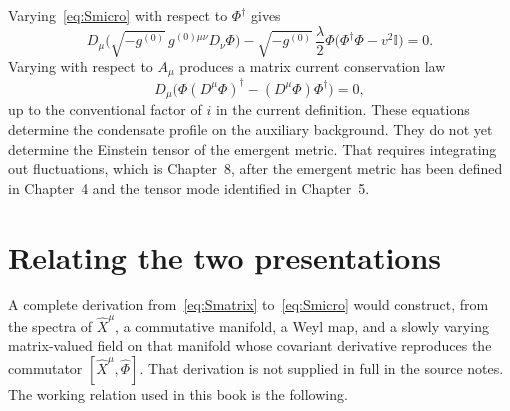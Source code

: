 Varying~\eqref{eq:Smicro} with respect to \(\Phi^\dagger\) gives
\begin{equation}
  \label{eq:Phi-eom}
  D_\mu\bigl(\sqrt{-g^{(0)}}\,g^{(0)\mu\nu}D_\nu\Phi\bigr)
  -\sqrt{-g^{(0)}}\,
   \frac{\lambda}{2}\Phi
   \bigl(\Phi^\dagger\Phi-v^2\mathbb{I}\bigr)
  =0.
\end{equation}
Varying with respect to \(A_\mu\) produces a matrix current
conservation law
\begin{equation}
  \label{eq:gauge-eom}
  D_\mu
  \bigl(
    \Phi(D^\mu\Phi)^\dagger-(D^\mu\Phi)\Phi^\dagger
  \bigr)
  =0,
\end{equation}
up to the conventional factor of \(i\) in the current definition.
These equations determine the condensate profile on the auxiliary
background. They do not yet determine the Einstein tensor of the
emergent metric. That requires integrating out fluctuations, which is
Chapter~8, after the emergent metric has been defined in Chapter~4
and the tensor mode identified in Chapter~5.

\section{Relating the two presentations}
\label{sec:ch3-relate}

A complete derivation from~\eqref{eq:Smatrix} to~\eqref{eq:Smicro}
would construct, from the spectra of \(\hat X^\mu\), a commutative
manifold, a Weyl map, and a slowly varying matrix-valued field on that
manifold whose covariant derivative reproduces the commutator
\([\hat X^\mu,\hat\Phi]\). That derivation is not supplied in full in
the source notes. The working relation used in this book is the
following.

